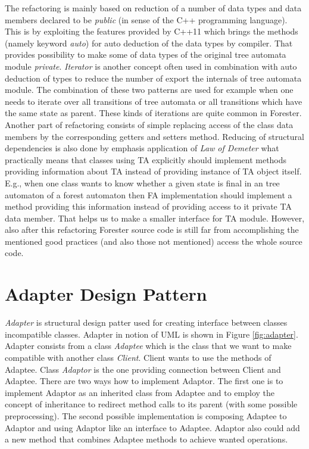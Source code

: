 The refactoring is mainly based on reduction of a number of data types and data members declared
to be \emph{public} (in sense of the C++ programming language).
This is by exploiting the features provided by C++11 \cite{stroustrup13}
which brings the methods (namely keyword \emph{auto})
for auto deduction of the data types by compiler.
That provides possibility to make some of data types of the original tree automata module \emph{private}.
\emph{Iterator} is another concept often used in combination with auto deduction of types to reduce the number of export the internals of tree automata module.
The combination of these two patterns are used for example when one needs
to iterate over all transitions of tree automata or all transitions which
have the same state as parent.
These kinds of iterations are quite common in Forester.
Another part of refactoring consists of simple replacing access of the class data members by the corresponding getters and setters method.
Reducing of structural dependencies is also done by emphasis application of \emph{Law of Demeter} \cite{lod89} what practically
means that classes using TA explicitly should implement methods providing information about TA instead of providing instance of TA object itself.
E.g., when one class wants to know whether a given state is final in an tree automaton of a forest automaton then FA implementation should
implement a method providing this information instead of providing access to it private TA data member.
That helps us to make a smaller interface for TA module.
However, also after this refactoring Forester source code is still far from accomplishing the mentioned good practices (and also those not mentioned)
access the whole source code.

\section{Adapter Design Pattern}
\label{sec:adapter}

\emph{Adapter} is structural design patter \cite{gamma95} used for creating interface between classes incompatible classes.
Adapter in notion of UML is shown in Figure \ref{fig:adapter}.
Adapter consists from a class \emph{Adaptee} which is the class that we want to make compatible with
another class \emph{Client}.
Client wants to use the methods of Adaptee.
Class \emph{Adaptor} is the one providing connection between Client and Adaptee.
There are two ways how to implement Adaptor.
The first one is to implement Adaptor as an inherited class from Adaptee
and to employ the concept of inheritance to redirect
method calls to its parent (with some possible preprocessing).
The second possible implementation is composing Adaptee to Adaptor and using Adaptor like an interface to Adaptee.
Adaptor also could add a new method that combines Adaptee methods to achieve wanted operations.

